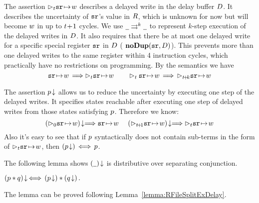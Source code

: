 

The assertion $\rhd_{t}{\texttt{sr}} \!\mapsto\! {w}$ describes a delayed
write in the delay buffer $D$. It describes the
uncertainty of $\texttt{sr}$'s value in $R$, which is unknown
for now but will become $w$ in up to $t\!+\!1$ cycles.
We use ${\underline{\ \,}}\rightrightarrows^{k}{\underline{\ \,}}$
to represent $k$-step execution of the delayed writes in $D$.
It also requires that there be
at most one delayed write for a specific special register $\texttt{sr}$
in $D$ (\ie{} $\textbf{noDup}({\texttt{sr}}, {D})$).
This prevents more than one delayed writes to
the same register within 4 instruction cycles, which practically
have no restrictions on programming.
By the semantics we have
$$
\regst{\sr}{\word} \,\Longrightarrow \dlyregst{\tick}{\sr}{\word}
\qquad
\dlyregst{\tick}{\sr}{\word} \,\Longrightarrow\,
\dlyregst{\tick\!+\!k}{\sr}{\word}
$$

The assertion ${p}\!\downarrow$ allows us to reduce the uncertainty
by executing one step of the delayed writes.
It specifies states reachable after executing
one step of delayed writes from those states satisfying $p$.
Therefore we know:
$$
\nxtAst{(\dlyregst{0}{\sr}{\word})} \Longrightarrow 
\regst{\sr}{\word}
\quad \
\nxtAst{(\dlyregst{\tick\!+\!1}{\sr}{\word})} \Longrightarrow
\dlyregst{\tick}{\sr}{\word}
$$
Also it's easy to see that if $p$ syntactically
does not contain sub-terms in the form of $\rhd_{t}{\texttt{sr}} \!\mapsto\! {w}$,
then $({p}\!\downarrow) \,\Longleftrightarrow \,p$.

The following lemma shows ${(\underline{\ \,})}\!\downarrow$ is distributive
over separating conjunction.
\begin{lemma} %
\label{lemma:dly-sep-split}
$
{(p * q)}\!\downarrow \,\Longleftrightarrow\, ({p}\!\downarrow) * ({q}\!\downarrow)\,.
$
\end{lemma}
The lemma can be proved following Lemma~\ref{lemma:RFileSplitExDelay}.


